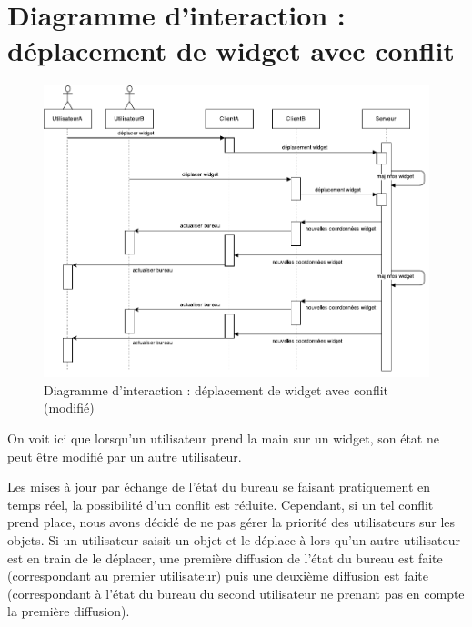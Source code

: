 \section{Diagramme d'interaction : déplacement de widget avec conflit}
\begin{figure}[H]
	\centering
	\includegraphics[angle=90]{diagrammes/DI3.pdf}
	\caption{\color{ForestGreen}Diagramme d'interaction : déplacement de widget avec conflit (modifié)\color{black}}
\end{figure}

\color{red}On voit ici que lorsqu'un utilisateur prend la main sur un widget, son état ne peut être modifié par un autre utilisateur.\color{black}

\color{ForestGreen}Les mises à jour par échange de l'état du bureau se faisant pratiquement en temps réel, la possibilité d'un conflit est réduite. Cependant, si un tel conflit prend place, nous avons décidé de ne pas gérer la priorité des utilisateurs sur les objets. Si un utilisateur saisit un objet et le déplace à lors qu'un autre utilisateur est en train de le déplacer, une première diffusion de l'état du bureau est faite (correspondant au premier utilisateur) puis une deuxième diffusion est faite (correspondant à l'état du bureau du second utilisateur ne prenant pas en compte la première diffusion). \color{black}